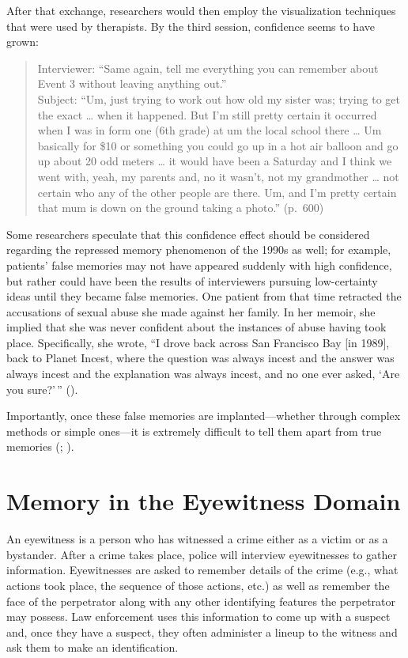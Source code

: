 \documentclass[
]{krantz}
\begin{document}
After that exchange, researchers would then employ the visualization techniques that were used by therapists. By the third session, confidence seems to have grown:

\begin{quote}
Interviewer: ``Same again, tell me everything you can remember about Event 3 without leaving anything out.''\\
Subject: ``Um, just trying to work out how old my sister was; trying to get the exact \ldots{} when it happened. But I'm still pretty certain it occurred when I was in form one (6th grade) at um the local school there \ldots{} Um basically for \$10 or something you could go up in a hot air balloon and go up about 20 odd meters \ldots{} it would have been a Saturday and I think we went with, yeah, my parents and, no it wasn't, not my grandmother \ldots{} not certain who any of the other people are there. Um, and I'm pretty certain that mum is down on the ground taking a photo.'' (p.~600)
\end{quote}

Some researchers speculate that this confidence effect should be considered regarding the repressed memory phenomenon of the 1990s as well; for example, patients' false memories may not have appeared suddenly with high confidence, but rather could have been the results of interviewers pursuing low-certainty ideas until they became false memories. One patient from that time retracted the accusations of sexual abuse she made against her family. In her memoir, she implied that she was never confident about the instances of abuse having took place. Specifically, she wrote, ``I drove back across San Francisco Bay {[}in 1989{]}, back to Planet Incest, where the question was always incest and the answer was always incest and the explanation was always incest, and no one ever asked, `Are you sure?'\,'' ().

Importantly, once these false memories are implanted---whether through complex methods or simple ones---it is extremely difficult to tell them apart from true memories (; ).

\section{Memory in the Eyewitness Domain}\label{memory-in-the-eyewitness-domain}

An eyewitness is a person who has witnessed a crime either as a victim or as a bystander. After a crime takes place, police will interview eyewitnesses to gather information. Eyewitnesses are asked to remember details of the crime (e.g., what actions took place, the sequence of those actions, etc.) as well as remember the face of the perpetrator along with any other identifying features the perpetrator may possess. Law enforcement uses this information to come up with a suspect and, once they have a suspect, they often administer a lineup to the witness and ask them to make an identification.
\end{document}

